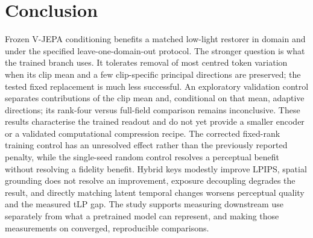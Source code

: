 \section{Conclusion}\label{sec:conclusion}

Frozen V-JEPA conditioning benefits a matched low-light restorer in domain and
under the specified leave-one-domain-out protocol. The stronger question is
what the trained branch uses. It tolerates removal of most centred token
variation when its clip mean and a few clip-specific principal directions are
preserved; the tested fixed replacement is much less successful. An exploratory
validation control separates contributions of the clip mean and, conditional
on that mean, adaptive directions; its rank-four versus full-field comparison
remains inconclusive. These results
characterise the trained readout and do not yet provide a smaller encoder or a
validated computational compression recipe. The corrected fixed-rank
training control has an unresolved effect rather than the previously reported
penalty, while the single-seed random control resolves a perceptual benefit
without resolving a fidelity benefit.
Hybrid keys modestly improve LPIPS, spatial grounding does not resolve an improvement, exposure decoupling
degrades the result, and directly matching latent temporal changes worsens
perceptual quality and the measured tLP gap. The study supports measuring
downstream use separately from what a pretrained model can represent, and
making those measurements on converged, reproducible comparisons.
